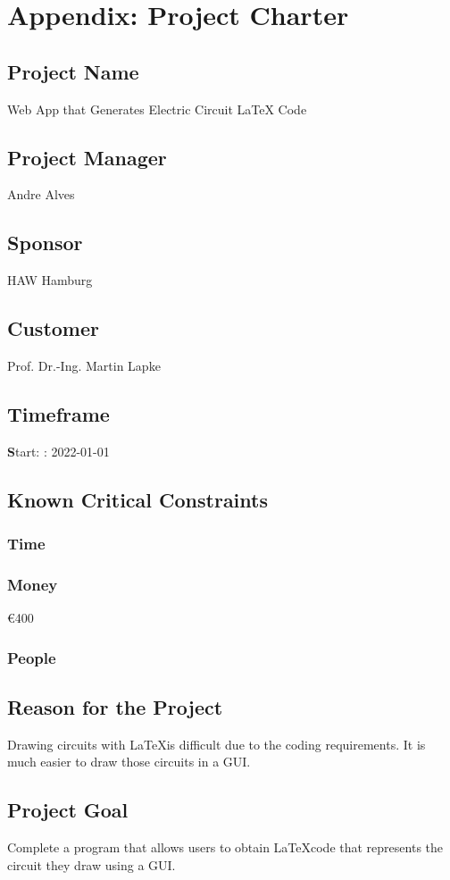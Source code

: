 %
\chapter{Appendix: Project Charter}\label{ch:appendix:-project-charter}
\section*{Project Name}
Web App that Generates Electric Circuit LaTeX Code
\section*{Project Manager}
Andre Alves
\section*{Sponsor}
HAW Hamburg
\section*{Customer}
Prof. Dr.-Ing. Martin Lapke
\section*{Timeframe}
{\textbf Start}: : 2022-01-01
\section*{Known Critical Constraints}
\subsection*{Time}

\subsection*{Money}
 \euro 400
\subsection*{People}

\section*{Reason for the Project}
Drawing circuits with \LaTeX is difficult due to the coding requirements.
It is much easier to draw those circuits in a GUI.

\section*{Project Goal}
Complete a program that allows users to obtain \LaTeX code that represents the circuit they draw using a GUI.

